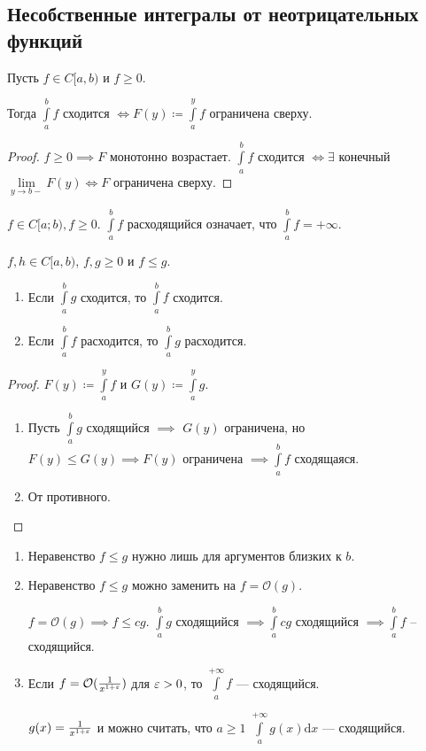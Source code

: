 \subsection*{Несобственные интегралы от неотрицательных функций}
\begin{theorem}
    Пусть  $f \in C[a, b)$ и  $f \ge 0$. 

    Тогда $\int\limits_a^b f$ сходится  $\iff F(y) \coloneqq \int\limits_a^y f$ ограничена сверху.
\end{theorem}
\begin{proof}
    $f \ge 0 \implies F$ монотонно возрастает. $\int\limits_a^b f$ сходится  $\iff \exists$ конечный  $\lim\limits_{y \to b-}F(y) \iff F$ ограничена сверху. 
\end{proof}
\begin{remark}
    $f \in C[a; b), f\ge 0$. $\int\limits_a^b f$ расходящийся означает, что  $\int\limits_a^b f = +\infty$.
\end{remark}
\begin{consequence}
    $f, h \in C[a, b)$,  $f, g \ge 0$ и $f \le g$.
    \begin{enumerate}
        \item Если $\int\limits_a^b g$ сходится, то  $\int\limits_a^b f$ сходится.
        \item Если  $\int\limits_a^b f$ расходится, то  $\int\limits_a^b g$ расходится.
    \end{enumerate}
\end{consequence}
\begin{proof}
    $F(y) \coloneqq \int\limits_a^y f$ и  $G(y) \coloneqq \int\limits_a^y g$.
     \begin{enumerate}
         \item Пусть $\int\limits_a^b g$ сходящийся  $\implies$  $G(y)$ ограничена, но  $F(y) \le G(y) \implies F(y)$ ограничена $\implies \int\limits_a^b f$ сходящаяся.
         \item От противного.
    \end{enumerate}
\end{proof}
\begin{remark}
    \begin{enumerate}
        \item Неравенство $f \le g$ нужно лишь для аргументов близких к $b$.
        \item Неравенство  $f \le g$ можно заменить на $f = \mathcal{O}(g)$.

            $f = \mathcal{O}(g) \implies f \le cg$. $\int\limits_a^b g$ сходящийся  $\implies \int\limits_a^b cg $ сходящийся  $\implies \int\limits_a^b f$ -- сходящийся.
        \item Если  $f = \mathcal{O}(\frac{1}{x^{1 + \varepsilon}})$ для $\varepsilon > 0$, то  $\int\limits_a^{+\infty} f$ --- сходящийся.

            $g(x) = \frac{1}{x^{1+\varepsilon}}$ и можно считать, что $a \ge 1$ $\int\limits_a^{+\infty} g(x) \mathrm{d}x$ --- сходящийся.
    \end{enumerate}
\end{remark}
